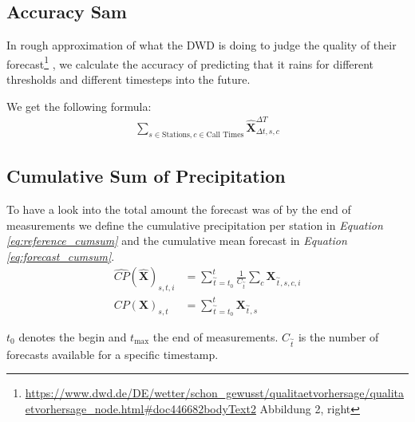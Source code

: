\documentclass{article}
\theoremstyle{plain}
\theoremstyle{definition}
\theoremstyle{remark}
\begin{document}


\subsection{Accuracy Sam}

In rough approximation of what the DWD is doing to judge the quality of their
forecast\footnote{\url{https://www.dwd.de/DE/wetter/schon_gewusst/qualitaetvorhersage/qualitaetvorhersage_node.html\#doc446682bodyText2}
    Abbildung 2, right}
, we calculate the accuracy of predicting that it rains for different
thresholds and different timesteps into the future.

We get the following formula:
\begin{align}
    \sum_{s \in \text{Stations},c \in \text{Call Times}}
    \hat{\textbf{X}}_{\Delta t, s, c}^{\Delta T}
\end{align}

\subsection{Cumulative Sum of Precipitation}

To have a look into the total amount the forecast was of by the end of
measurements we define the cumulative precipitation per station in
\textit{Equation \ref{eq:reference_cumsum}} and the cumulative mean forecast in
\textit{Equation \ref{eq:forecast_cumsum}}.
\begin{align}
    \widehat{CP}(\hat{\textbf{X}})_{s, t, i} & =  \sum_{\overset{\sim}{t} =
        t_0}^{t} \frac{1}{C_{\overset{\sim}{t}}}\sum_c \textbf{X}_{\overset{\sim}{t},
    s, c,  i}
    \label{eq:forecast_cumsum}                                                      \\
    CP(\textbf{X})_{s, t}                    & = \sum_{\overset{\sim}{t} = t_0}^{t}
    \textbf{X}_{\overset{\sim}{t}, s}
    \label{eq:reference_cumsum}
\end{align}

$t_0$ denotes the begin and $t_{\max}$ the end of measurements.
$C_{\overset{\sim}{t}}$ is the number of forecasts available for a specific
timestamp.
\end{document}
